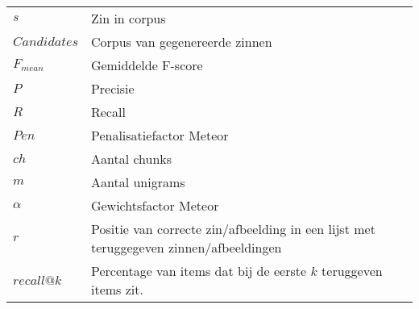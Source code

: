 \documentclass[master=cws,masteroption=ai]{kulemt}
\begin{document}
		\begin{flushleft}
			\renewcommand{\arraystretch}{1.1}
			\begin{tabularx}{\textwidth}{@{}p{25mm}X@{}}
	$s$			& Zin in corpus\\
	$Candidates$        & Corpus van gegenereerde zinnen\\
	$F_{mean}$  & Gemiddelde F-score\\
	$P$			& Precisie\\
	$R$			& Recall\\
	$Pen$		& Penalisatiefactor Meteor\\
	$ch$		& Aantal chunks\\
	$m$			& Aantal unigrams\\
	$\alpha$	& Gewichtsfactor Meteor\\
	$r$			& Positie van correcte zin/afbeelding in een lijst met teruggegeven zinnen/afbeeldingen\\
	$recall@k$	& Percentage van items dat bij de eerste $k$ teruggeven items zit.\\
  \end{tabularx}
\end{flushleft}

\mainmatter











\appendixpage*          %
\appendix




\backmatter


\end{document}
